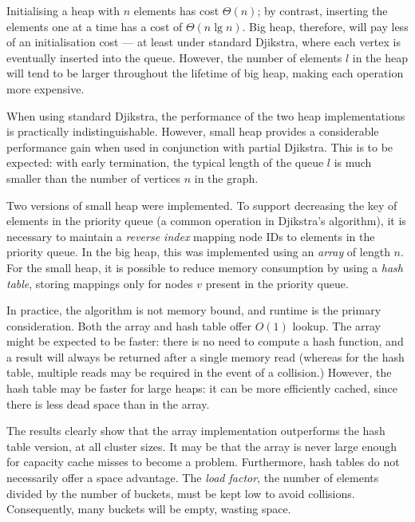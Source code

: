 Initialising a heap with $n$ elements has cost $\Theta(n)$; by contrast, inserting the elements one at a time has a cost of $\Theta(n\lg n)$. Big heap, therefore, will pay less of an initialisation cost --- at least under standard Djikstra, where each vertex is eventually inserted into the queue. However, the number of elements $l$ in the heap will tend to be larger throughout the lifetime of big heap, making each operation more expensive.

When using standard Djikstra, the performance of the two heap implementations is practically indistinguishable. However, small heap provides a considerable performance gain when used in conjunction with partial Djikstra. This is to be expected: with early termination, the typical length of the queue $l$ is much smaller than the number of vertices $n$ in the graph.

Two versions of small heap were implemented. To support decreasing the key of elements in the priority queue (a common operation in Djikstra's algorithm), it is necessary to maintain a \emph{reverse index} mapping node IDs to elements in the priority queue. In the big heap, this was implemented using an \emph{array} of length $n$. For the small heap, it is possible to reduce memory consumption by using a \emph{hash table}, storing mappings only for nodes $v$ present in the priority queue.

In practice, the algorithm is not memory bound, and runtime is the primary consideration. Both the array and hash table offer $O(1)$ lookup. The array might be expected to be faster: there is no need to compute a hash function, and a result will always be returned after a single memory read (whereas for the hash table, multiple reads may be required in the event of a collision.) However, the hash table may be faster for large heaps: it can be more efficiently cached, since there is less dead space than in the array.

The results clearly show that the array implementation outperforms the hash table version, at all cluster sizes. It may be that the array is never large enough for capacity cache misses to become a problem. Furthermore, hash tables do not necessarily offer a space advantage. The \emph{load factor}, the number of elements divided by the number of buckets, must be kept low to avoid collisions. Consequently, many buckets will be empty, wasting space.


